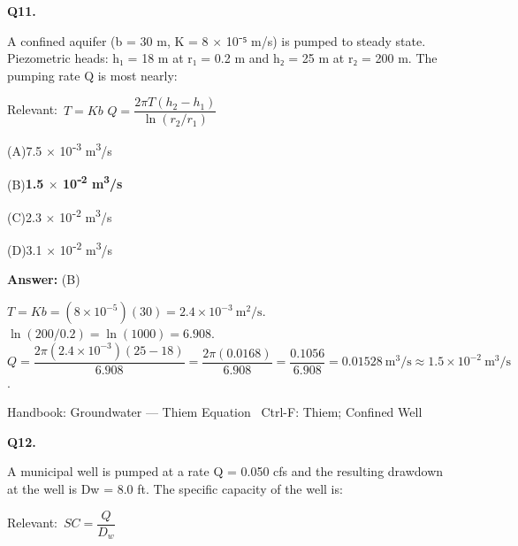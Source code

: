\documentclass[11pt]{article}
\newcommand{\correct}[1]{\textbf{#1}\;{\color{accent}$\checkmark$}}
\newcommand{\optline}[2]{\par\noindent\hspace{1.2em}(#1)\hspace{0.6em}#2}
\begin{document}
\textbf{\color{accent}Q11.}\par\vspace{2pt}
A confined aquifer (b = 30 m, K = 8 $\times$ 10⁻⁵ m/s) is pumped to steady state. Piezometric heads: h₁ = 18 m at r₁ = 0.2 m and h₂ = 25 m at r₂ = 200 m. The pumping rate Q is most nearly:\par\vspace{3pt}
{\small\color{soft}Relevant:}\ $T = Kb$ \quad $Q = \dfrac{2\pi T(h_2-h_1)}{\ln(r_2/r_1)}$\par\vspace{3pt}
\optline{A}{7.5 $\times$ 10⁻\textsuperscript{3} m\textsuperscript{3}/s}
\optline{B}{\correct{1.5 $\times$ 10⁻\textsuperscript{2} m\textsuperscript{3}/s}}
\optline{C}{2.3 $\times$ 10⁻\textsuperscript{2} m\textsuperscript{3}/s}
\optline{D}{3.1 $\times$ 10⁻\textsuperscript{2} m\textsuperscript{3}/s}
\par\vspace{3pt}
\vspace{2pt}\par\noindent\colorbox{boxbg}{\parbox{\dimexpr\linewidth-2\fboxsep\relax}{%
\vspace{2pt}\textbf{Answer:} (B)\par\vspace{2pt}
{\small $T = Kb = (8\times10^{-5})(30) = 2.4\times10^{-3}\ \mathrm{m^2/s}$.  $\ln(200/0.2) = \ln(1000) = 6.908$.  $Q = \dfrac{2\pi(2.4\times10^{-3})(25-18)}{6.908} = \dfrac{2\pi(0.0168)}{6.908} = \dfrac{0.1056}{6.908} = 0.01528\ \mathrm{m^3/s} \approx 1.5\times10^{-2}\ \mathrm{m^3/s}$.}\par\vspace{2pt}
{\footnotesize\color{soft}Handbook: Groundwater --- Thiem Equation \textbullet\ Ctrl-F: Thiem; Confined Well}\vspace{2pt}
}}
\vspace{9pt}
\filbreak
\textbf{\color{accent}Q12.}\par\vspace{2pt}
A municipal well is pumped at a rate Q = 0.050 cfs and the resulting drawdown at the well is Dw = 8.0 ft. The specific capacity of the well is:\par\vspace{3pt}
{\small\color{soft}Relevant:}\ $SC = \dfrac{Q}{D_w}$\par\vspace{3pt}
\end{document}
